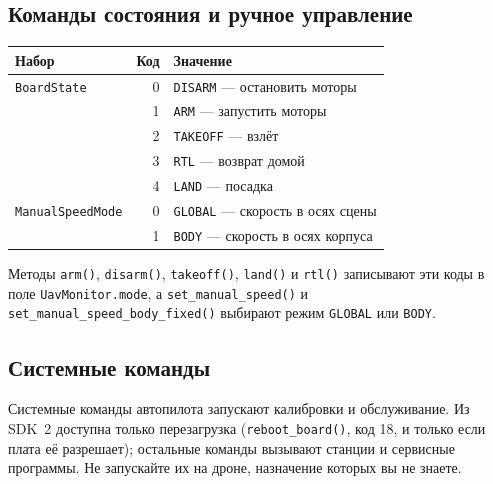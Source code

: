 \subsection*{Команды состояния и ручное управление}

\begin{center}
\small
\begin{tabularx}{\linewidth}{@{}l r X@{}}
\toprule
\textbf{Набор} & \textbf{Код} & \textbf{Значение} \\
\midrule
\texttt{BoardState} & 0 & \texttt{DISARM} --- остановить моторы \\
 & 1 & \texttt{ARM} --- запустить моторы \\
 & 2 & \texttt{TAKEOFF} --- взлёт \\
 & 3 & \texttt{RTL} --- возврат домой \\
 & 4 & \texttt{LAND} --- посадка \\
\midrule
\texttt{ManualSpeedMode} & 0 & \texttt{GLOBAL} --- скорость в осях сцены \\
 & 1 & \texttt{BODY} --- скорость в осях корпуса \\
\bottomrule
\end{tabularx}
\end{center}

Методы \verb|arm()|, \verb|disarm()|, \verb|takeoff()|, \verb|land()| и \verb|rtl()| записывают эти коды в поле \texttt{UavMonitor.mode}, а \verb|set_manual_speed()| и \verb|set_manual_speed_body_fixed()| выбирают режим \texttt{GLOBAL} или \texttt{BODY}.

\subsection*{Системные команды}

Системные команды автопилота запускают калибровки и обслуживание. Из SDK~2 доступна только перезагрузка (\verb|reboot_board()|, код 18, и только если плата её разрешает); остальные команды вызывают станции и сервисные программы. Не запускайте их на дроне, назначение которых вы не знаете.

